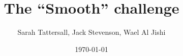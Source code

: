 \title{The ``Smooth'' challenge}

\author{Sarah Tattersall, Jack Stevenson, Wael Al Jishi}

\date{\today}